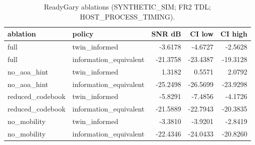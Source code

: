 \begin{table}[h]\centering
\caption{ReadyGary ablations (SYNTHETIC\_SIM; FR2 TDL; HOST\_PROCESS\_TIMING).}
\begin{tabular}{llrrr}\toprule ablation & policy & SNR dB & CI low & CI high \\\midrule
full & twin\_informed & -3.6178 & -4.6727 & -2.5628 \\
full & information\_equivalent & -21.3758 & -23.4387 & -19.3128 \\
no\_aoa\_hint & twin\_informed & 1.3182 & 0.5571 & 2.0792 \\
no\_aoa\_hint & information\_equivalent & -25.2498 & -26.5699 & -23.9298 \\
reduced\_codebook & twin\_informed & -5.8291 & -7.4856 & -4.1726 \\
reduced\_codebook & information\_equivalent & -21.5889 & -22.7943 & -20.3835 \\
no\_mobility & twin\_informed & -3.3810 & -3.9201 & -2.8419 \\
no\_mobility & information\_equivalent & -22.4346 & -24.0433 & -20.8260 \\
\bottomrule\end{tabular}\end{table}
